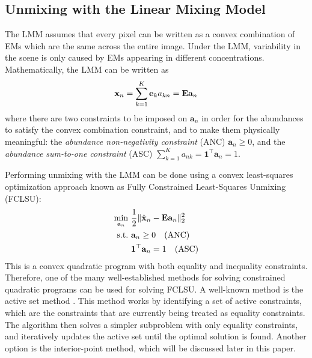 \subsection{Unmixing with the Linear Mixing Model}
The LMM assumes that every pixel can be written as a convex combination of EMs which are the same across the entire image. Under the LMM, variability in the scene is only caused by EMs appearing in different concentrations. Mathematically, the LMM can be written as
\begin{equation} \label{eq: linear mixing model}
    \mathbf{x}_n = \sum_{k=1}^K \mathbf{e}_{k} a_{kn} =  \mathbf{E} \mathbf{a}_n
\end{equation}
where there are two constraints to be imposed on $\mathbf{a}_n$ in order for the abundances to satisfy the convex combination constraint, and to make them physically meaningful: the \textit{abundance non-negativity constraint} (ANC) $\mathbf{a}_n \geq 0$, and the \textit{abundance sum-to-one constraint} (ASC) 
$\sum_{k=1}^K a_{nk} = \mathbf{1}^\top \mathbf{a}_n = 1$.

Performing unmixing with the LMM can be done using a convex least-squares optimization approach known as Fully Constrained Least-Squares Unmixing (FCLSU):
\begin{equation} \label{eq: fclsu}
    \begin{aligned}
    \min_{\mathbf{a}_n} &~ \frac{1}{2} \|\hat{\mathbf{x}}_n - \mathbf{E} \mathbf{a}_n\|^2_2 \\
    \mathrm{s.t.} &~ \mathbf{a}_n \geq 0 \quad \text{(ANC)} \\
    &~\mathbf{1}^\top \mathbf{a}_n = 1 \quad \text{(ASC)}
    \end{aligned}
\end{equation}
This is a convex quadratic program with both equality and inequality constraints. Therefore, one of the many well-established methods for solving constrained quadratic programs can be used for solving FCLSU. A well-known method is the active set method \cite{nocedal_numerical_2006}. This method works by identifying a set of active constraints, which are the constraints that are currently being treated as equality constraints. The algorithm then solves a simpler subproblem with only equality constraints, and iteratively updates the active set until the optimal solution is found. Another option is the interior-point method, which will be discussed later in this paper.

